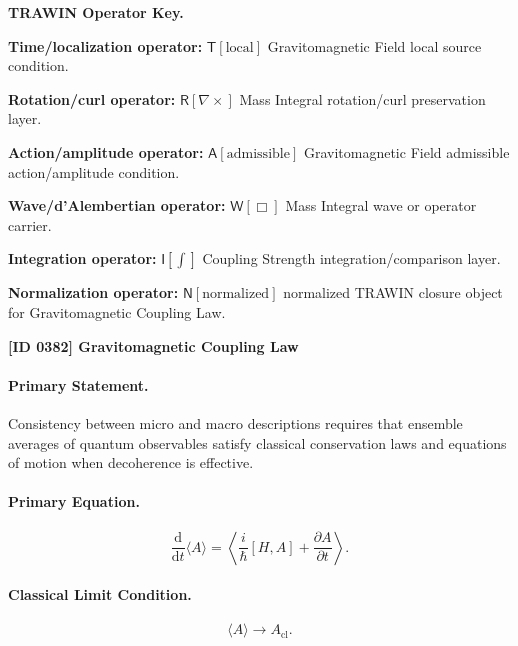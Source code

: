 \par\vspace{0.45\baselineskip}
\noindent\begin{minipage}[t]{\linewidth}
\begingroup
\small
\raggedright
\textbf{TRAWIN Operator Key.}\par
\noindent\textbf{Time/localization operator:} $\mathsf{T}\!\left[\mathrm{local}\right]$ Gravitomagnetic Field local source condition.\par
\noindent\textbf{Rotation/curl operator:} $\mathsf{R}\!\left[\nabla\times\right]$ Mass Integral rotation/curl preservation layer.\par
\noindent\textbf{Action/amplitude operator:} $\mathsf{A}\!\left[\mathrm{admissible}\right]$ Gravitomagnetic Field admissible action/amplitude condition.\par
\noindent\textbf{Wave/d'Alembertian operator:} $\mathsf{W}\!\left[\Box\right]$ Mass Integral wave or operator carrier.\par
\noindent\textbf{Integration operator:} $\mathsf{I}\!\left[\int\right]$ Coupling Strength integration/comparison layer.\par
\noindent\textbf{Normalization operator:} $\mathsf{N}\!\left[\mathrm{normalized}\right]$ normalized TRAWIN closure object for Gravitomagnetic Coupling Law.\par
\endgroup
\end{minipage}

\clearpage
\noindent\textbf{[ID 0382] Gravitomagnetic Coupling Law}\par
\vspace{0.35em}
\paragraph{Primary Statement.}
Consistency between micro and macro descriptions requires that ensemble averages of quantum observables satisfy classical conservation laws and equations of motion when decoherence is effective.

\paragraph{Primary Equation.}
\begin{equation}
\frac{\mathrm{d}}{\mathrm{d}t}\langle A\rangle
=
\left\langle
\frac{i}{\hbar}[H,A]
+
\frac{\partial A}{\partial t}
\right\rangle .
\end{equation}

\paragraph{Classical Limit Condition.}
\begin{equation}
\langle A\rangle
\longrightarrow
A_{\mathrm{cl}} .
\end{equation}

